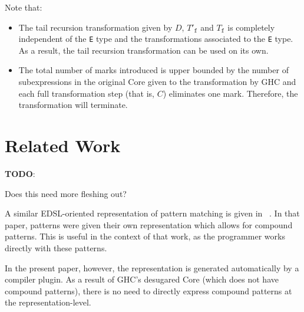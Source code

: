 \documentclass[sigplan,anonymous,review]{acmart}
\newcommand{\ttt}{\texttt}
\newenvironment{todo}
  {\begin{tcolorbox}
   \textbf{TODO}:
  }
  {\end{tcolorbox}
  }
\begin{document}
\clearpage

Note that:
\begin{itemize}
  \item The tail recursion transformation given by $D$, $T'_{\ttt{f}}$ and $T_{\ttt{f}}$ is completely independent of the \ttt{E} type and the transformations associated to the \ttt{E} type. As a result, the tail recursion transformation can be used on its own.

  \item The total number of marks introduced is upper bounded by the number of
subexpressions in the original Core given to the transformation by GHC and each
full transformation step (that is, $C$) eliminates one mark. Therefore, the
transformation will terminate.
\end{itemize}

\clearpage
\section{Related Work}
\begin{todo}
  Does this need more fleshing out?
\end{todo}

A similar EDSL-oriented representation of pattern matching is given in
~\cite[Section~3.3]{Atkey:09:Unembedding}. In that paper, patterns were given their own
representation which allows for compound patterns. This is useful in the context
of that work, as the programmer works directly with these patterns.

In the present paper, however, the representation is generated automatically by
a compiler plugin. As a result of GHC's desugared Core (which does not have
compound patterns), there is no need to directly express compound patterns at
the representation-level.






\appendix
\end{document}
